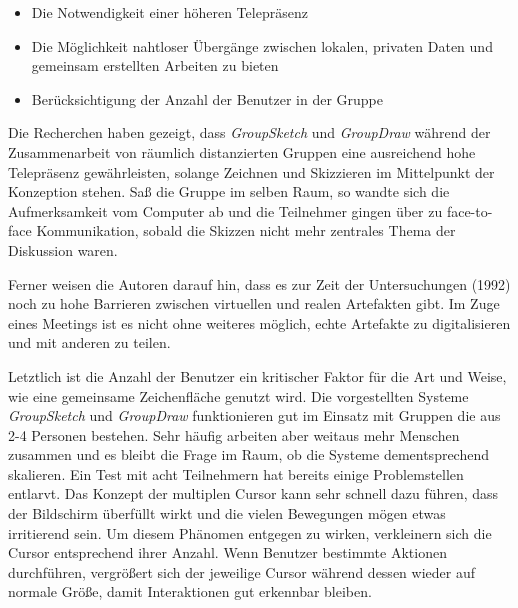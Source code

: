 \begin{itemize}
	\item
	Die Notwendigkeit einer höheren Telepräsenz
	\item
	Die Möglichkeit nahtloser Übergänge zwischen lokalen, privaten Daten und gemeinsam erstellten Arbeiten zu bieten
	\item
	Berücksichtigung der Anzahl der Benutzer in der Gruppe
\end{itemize}

Die Recherchen \citep{Greenberg:1992p207} haben gezeigt, dass \emph{GroupSketch} und \emph{GroupDraw} während der Zusammenarbeit von räumlich distanzierten Gruppen eine ausreichend hohe Telepräsenz gewährleisten, solange Zeichnen und Skizzieren im Mittelpunkt der Konzeption stehen. Saß die Gruppe im selben Raum, so wandte sich die Aufmerksamkeit vom Computer ab und die Teilnehmer gingen über zu face-to-face Kommunikation, sobald die Skizzen nicht mehr zentrales Thema der Diskussion waren. 

Ferner weisen die Autoren \citep{Greenberg:1992p207} darauf hin, dass es zur Zeit der Untersuchungen (1992) noch zu hohe Barrieren zwischen virtuellen und realen Artefakten gibt. Im Zuge eines Meetings ist es nicht ohne weiteres möglich, echte Artefakte zu digitalisieren und mit anderen zu teilen.

Letztlich ist die Anzahl der Benutzer ein kritischer Faktor für die Art und Weise, wie eine gemeinsame Zeichenfläche genutzt wird. Die vorgestellten Systeme \emph{GroupSketch} und \emph{GroupDraw} funktionieren gut im Einsatz mit Gruppen die aus 2-4 Personen bestehen. Sehr häufig arbeiten aber weitaus mehr Menschen zusammen und es bleibt die Frage im Raum, ob die Systeme dementsprechend skalieren. Ein Test mit acht Teilnehmern hat bereits einige Problemstellen entlarvt. Das Konzept der multiplen Cursor kann sehr schnell dazu führen, dass der Bildschirm überfüllt wirkt und die vielen Bewegungen mögen etwas irritierend sein. Um diesem Phänomen entgegen zu wirken, verkleinern sich die Cursor entsprechend ihrer Anzahl. Wenn Benutzer bestimmte Aktionen durchführen, vergrößert sich der jeweilige Cursor während dessen wieder auf normale Größe, damit Interaktionen gut erkennbar bleiben. 

